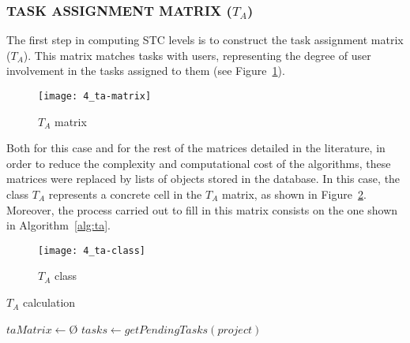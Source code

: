 \subsubsection{TASK ASSIGNMENT MATRIX ($T_A$)}

The first step in computing STC levels is to construct the task assignment matrix ($T_A$). This matrix matches tasks with users, representing the degree of user involvement in the tasks assigned to them (see Figure~\ref{fig:ta-matrix}).

\begin{figure}
	\centering
	\texttt{[image: 4\_ta-matrix]}
	\caption[$T_A$ matrix]{$T_A$ matrix}
	\label{fig:ta-matrix}
\end{figure}

Both for this case and for the rest of the matrices detailed in the literature, in order to reduce the complexity and computational cost of the algorithms, these matrices were replaced by lists of objects stored in the database. In this case, the class $T_A$ represents a concrete cell in the $T_A$ matrix, as shown in Figure~\ref{fig:ta-class}. Moreover, the process carried out to fill in this matrix consists on the one shown in Algorithm~\ref{alg:ta}.

\begin{figure}
	\centering
	\texttt{[image: 4\_ta-class]}
	\caption[$T_A$ class]{$T_A$ class}
	\label{fig:ta-class}
\end{figure}

\begin{algorithm}
    
    \DontPrintSemicolon
    
    \caption{$T_A$ calculation}
    \label{alg:ta}
        
        $taMatrix \longleftarrow $\O$ $\;
        $tasks \longleftarrow getPendingTasks(project) $\;
        
    
\end{algorithm}

